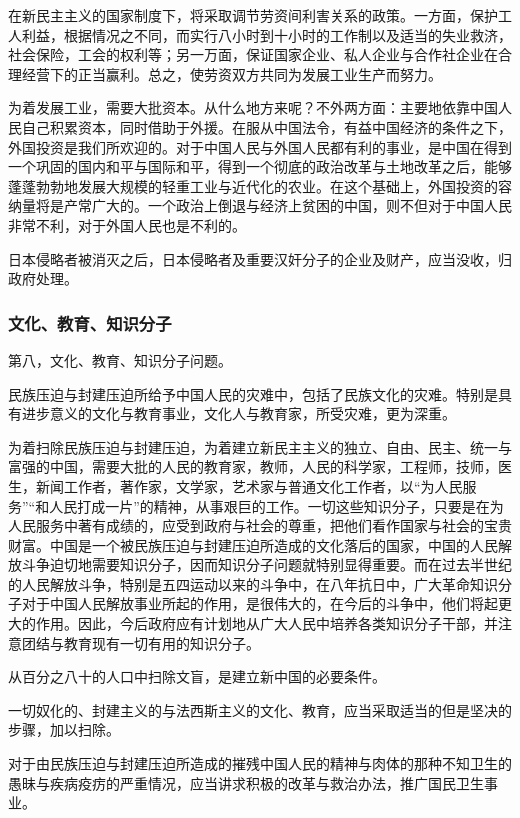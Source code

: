 在新民主主义的国家制度下，将采取调节劳资间利害关系的政策。一方面，保护工人利益，根据情况之不同，而实行八小时到十小时的工作制以及适当的失业救济，社会保险，工会的权利等；另一万面，保证国家企业、私人企业与合作社企业在合理经营下的正当赢利。总之，使劳资双方共同为发展工业生产而努力。

为着发展工业，需要大批资本。从什么地方来呢？不外两方面：主要地依靠中国人民自己积累资本，同时借助于外援。在服从中国法令，有益中国经济的条件之下，外国投资是我们所欢迎的。对于中国人民与外国人民都有利的事业，是中国在得到一个巩固的国内和平与国际和平，得到一个彻底的政治改革与土地改革之后，能够蓬蓬勃勃地发展大规模的轻重工业与近代化的农业。在这个基础上，外国投资的容纳量将是产常广大的。一个政治上倒退与经济上贫困的中国，则不但对于中国人民非常不利，对于外国人民也是不利的。

日本侵略者被消灭之后，日本侵略者及重要汉奸分子的企业及财产，应当没收，归政府处理。

\subsubsection{文化、教育、知识分子}

第八，文化、教育、知识分子问题。

民族压迫与封建压迫所给予中国人民的灾难中，包括了民族文化的灾难。特别是具有进步意义的文化与教育事业，文化人与教育家，所受灾难，更为深重。

为着扫除民族压迫与封建压迫，为着建立新民主主义的独立、自由、民主、统一与富强的中国，需要大批的人民的教育家，教师，人民的科学家，工程师，技师，医生，新闻工作者，著作家，文学家，艺术家与普通文化工作者，以“为人民服务”“和人民打成一片”的精神，从事艰巨的工作。一切这些知识分子，只要是在为人民服务中著有成绩的，应受到政府与社会的尊重，把他们看作国家与社会的宝贵财富。中国是一个被民族压迫与封建压迫所造成的文化落后的国家，中国的人民解放斗争迫切地需要知识分子，因而知识分子问题就特别显得重要。而在过去半世纪的人民解放斗争，特别是五四运动以来的斗争中，在八年抗日中，广大革命知识分子对于中国人民解放事业所起的作用，是很伟大的，在今后的斗争中，他们将起更大的作用。因此，今后政府应有计划地从广大人民中培养各类知识分子干部，并注意团结与教育现有一切有用的知识分子。

从百分之八十的人口中扫除文盲，是建立新中国的必要条件。

一切奴化的、封建主义的与法西斯主义的文化、教育，应当采取适当的但是坚决的步骤，加以扫除。

对于由民族压迫与封建压迫所造成的摧残中国人民的精神与肉体的那种不知卫生的愚昧与疾病疫疠的严重情况，应当讲求积极的改革与救治办法，推广国民卫生事业。

